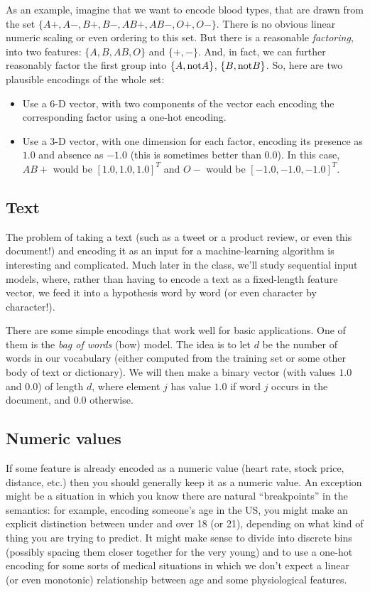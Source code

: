 As an example, imagine that we want to encode blood types, that are
drawn from the set $\{A+, A-, B+, B-, AB+, AB-, O+, O-\}$.  There is
no obvious linear numeric scaling or even ordering to this set.  But
there is a reasonable {\em factoring}, into two features: $\{A, B, AB,
O\}$ and $\{+, -\}$.  And, in fact, we can further reasonably factor
the first group into $\{A, {\rm not}A\}$, $\{B, {\rm not}B\}$.  So, here are two plausible encodings
of the whole set:
\begin{itemize}
\item Use a 6-D vector, with two components of the vector each encoding the
  corresponding factor using a one-hot encoding.
\item Use a 3-D vector, with one dimension for each factor, encoding
  its presence as $1.0$ and absence as $-1.0$ (this is sometimes
  better than $0.0$).  In this case, $AB+$ would be $[1.0, 1.0, 1.0]^T$
  and $O-$ would be $[-1.0, -1.0, -1.0]^T$.
\end{itemize}

\subsection{Text}
The problem of taking a text (such as a tweet or a product review, or
even this document!) and encoding it as an input for a
machine-learning algorithm is interesting and complicated.  Much later
in the class, we'll study sequential input models, where, rather than
having to encode a text as a fixed-length feature vector, we feed it
into a hypothesis word by word (or even character by character!).

There are some simple encodings that work well for basic
applications.  One of them is the {\em bag of words} ({\sc bow})
model.  The idea is to let $d$ be the number of words in our
vocabulary (either computed from the training set or some other body
of text or dictionary).  We will then make a binary vector (with
values $1.0$ and $0.0$) of length $d$, where element $j$ has value
$1.0$ if word $j$ occurs in the document, and $0.0$ otherwise.

\subsection{Numeric values}
\label{realFeatures}
If some feature is already encoded as a numeric value (heart rate,
stock price, distance, etc.) then you should generally keep it as a
numeric value.   An exception might be a situation in which you know
there are natural ``breakpoints'' in the semantics:  for example,
encoding someone's age in the US, you might make an explicit
distinction between under and over 18 (or 21), depending on what kind
of thing you are trying to predict.   It might make sense to divide
into discrete bins (possibly spacing them closer together for the very
young) and to use a one-hot encoding for some sorts of medical situations
in which we don't expect a linear (or even monotonic) relationship
between age and some physiological features.

